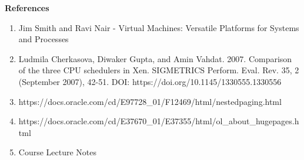 \documentclass[11pt,a4paper,oneside]{article}
\begin{document}
    \textbf{References}
    \begin{enumerate}
    	\item Jim Smith and Ravi Nair - Virtual Machines: Versatile Platforms for Systems and Processes 
    	\item Ludmila Cherkasova, Diwaker Gupta, and Amin Vahdat. 2007. Comparison of the three CPU schedulers in Xen. SIGMETRICS Perform. Eval. Rev. 35, 2 (September 2007), 42-51. DOI: https://doi.org/10.1145/1330555.1330556
    	\item https://docs.oracle.com/cd/E97728\_01/F12469/html/nestedpaging.html
    	\item https://docs.oracle.com/cd/E37670\_01/E37355/html/ol\_about\_hugepages.html
    	\item Course Lecture Notes   	
    \end{enumerate}
 

    
\end{document}
